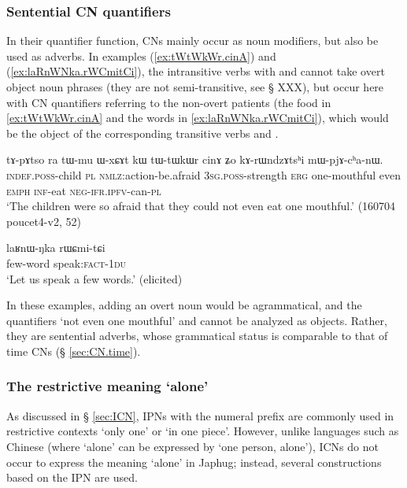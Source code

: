 \subsubsection{Sentential CN quantifiers}
In their quantifier function, CNs mainly occur as noun modifiers, but also be used as adverbs. In examples (\ref{ex:tWtWkWr.cinA}) and (\ref{ex:laRnWNka.rWCmitCi}), the intransitive verbs with  and  cannot take overt object noun phrases (they are not semi-transitive, see § XXX), but occur here with CN quantifiers referring to the non-overt patients (the food in \ref{ex:tWtWkWr.cinA} and the words in \ref{ex:laRnWNka.rWCmitCi}), which would be the object of the corresponding transitive verbs  and  .


\begin{exe}
\ex \label{ex:tWtWkWr.cinA}
 \gll tɤ-pɤtso ra tɯ-mu ɯ-xɕɤt kɯ tɯ-tɯkɯr cinɤ ʑo kɤ-rɯndzɤtsʰi mɯ-pjɤ-cʰa-nɯ. \\
 \textsc{indef}.\textsc{poss}-child \textsc{pl} \textsc{nmlz}:action-be.afraid \textsc{3sg}.\textsc{poss}-strength \textsc{erg} one-mouthful even \textsc{emph} \textsc{inf}-eat \textsc{neg}-\textsc{ifr}.\textsc{ipfv}-can-\textsc{pl} \\
\glt `The children were so afraid that they could not even eat one mouthful.' (160704 poucet4-v2, 52)
\end{exe}

\begin{exe}
\ex \label{ex:laRnWNka.rWCmitCi}
 \gll laʁnɯ-ŋka rɯɕmi-tɕi \\
 few-word speak:\textsc{fact}-\textsc{1du} \\
 \glt `Let us speak a few words.' (elicited)
\end{exe}

In these examples, adding an overt noun would be agrammatical, and the quantifiers  `not even one mouthful' and  cannot be analyzed as objects. Rather, they are sentential adverbs, whose grammatical status is comparable to that of time CNs (§ \ref{sec:CN.time}).

\subsubsection{The restrictive meaning `alone'} \label{sec:stWsti}
As discussed in § \ref{sec:ICN},  IPNs with the numeral prefix  are commonly used in restrictive contexts `only one' or  `in one piece'. However, unlike languages such as Chinese (where  `alone' can be expressed by   `one person, alone'), ICNs do not occur to express the meaning `alone' in Japhug; instead, several constructions based on the IPN  are used.


